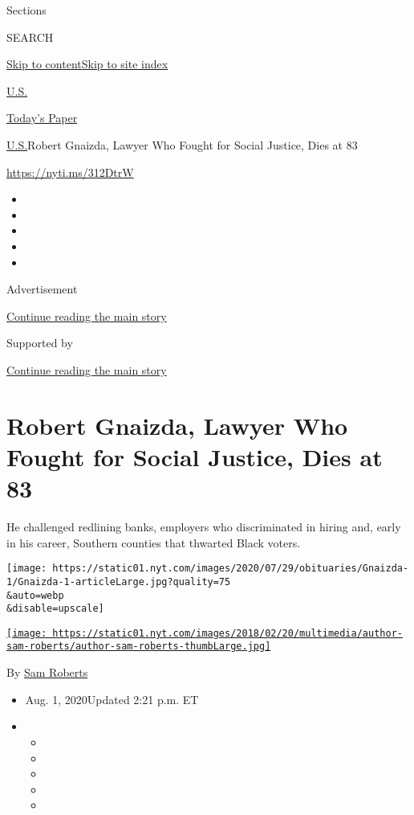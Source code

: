 Sections

SEARCH

\protect\hyperlink{site-content}{Skip to
content}\protect\hyperlink{site-index}{Skip to site index}

\href{https://www.nytimes.com/section/us}{U.S.}

\href{https://myaccount.nytimes.com/auth/login?response_type=cookie\&client_id=vi}{}

\href{https://www.nytimes.com/section/todayspaper}{Today's Paper}

\href{/section/us}{U.S.}\textbar{}Robert Gnaizda, Lawyer Who Fought for
Social Justice, Dies at 83

\url{https://nyti.ms/312DtrW}

\begin{itemize}
\item
\item
\item
\item
\item
\end{itemize}

Advertisement

\protect\hyperlink{after-top}{Continue reading the main story}

Supported by

\protect\hyperlink{after-sponsor}{Continue reading the main story}

\hypertarget{robert-gnaizda-lawyer-who-fought-for-social-justice-dies-at-83}{%
\section{Robert Gnaizda, Lawyer Who Fought for Social Justice, Dies at
83}\label{robert-gnaizda-lawyer-who-fought-for-social-justice-dies-at-83}}

He challenged redlining banks, employers who discriminated in hiring
and, early in his career, Southern counties that thwarted Black voters.

\texttt{[image: https://static01.nyt.com/images/2020/07/29/obituaries/Gnaizda-1/Gnaizda-1-articleLarge.jpg?quality=75\\\&auto=webp\\\&disable=upscale]}

\href{https://www.nytimes.com/by/sam-roberts}{\texttt{[image: https://static01.nyt.com/images/2018/02/20/multimedia/author-sam-roberts/author-sam-roberts-thumbLarge.jpg]}}

By \href{https://www.nytimes.com/by/sam-roberts}{Sam Roberts}

\begin{itemize}
\item
  Aug. 1, 2020Updated 2:21 p.m. ET
\item
  \begin{itemize}
  \item
  \item
  \item
  \item
  \item
  \end{itemize}
\end{itemize}

